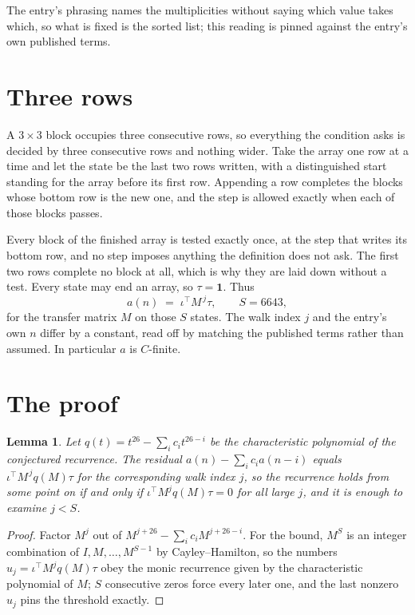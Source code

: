 \documentclass[11pt,a4paper]{article}
\theoremstyle{plain}
\newtheorem{lemma}[theorem]{Lemma}
\theoremstyle{definition}
\begin{document}
The entry's phrasing names the multiplicities without saying which value takes which, so what is fixed is the sorted list; this reading is pinned against the entry's own published terms.

\section{Three rows}

A $3\times3$ block occupies three consecutive rows, so everything the condition asks is decided
by three consecutive rows and nothing wider. Take the array one row at a time and let the state
be the last two rows written, with a distinguished start standing for the array before its
first row. Appending a row completes the blocks whose bottom row is the new one, and the step
is allowed exactly when each of those blocks passes.

Every block of the finished array is tested exactly once, at the step that writes its bottom
row, and no step imposes anything the definition does not ask. The first two rows complete no
block at all, which is why they are laid down without a test. Every state may end an array, so
$\tau=\mathbf{1}$. Thus
\[
a(n)\;=\;\iota^{\!\top}M^{\,j}\tau ,\qquad S=6643,
\]
for the transfer matrix $M$ on those $S$ states. The walk index $j$ and the entry's own $n$
differ by a constant, read off by matching the published terms rather than assumed. In
particular $a$ is $C$-finite.

\section{The proof}

\begin{lemma}\label{lem:crit}
Let $q(t)=t^{26}-\sum_i c_it^{26-i}$ be the characteristic polynomial of the
conjectured recurrence. The residual $a(n)-\sum_ic_ia(n-i)$ equals
$\iota^{\!\top}M^{\,j}q(M)\tau$ for the corresponding walk index $j$, so the recurrence
holds from some point on if and only if $\iota^{\!\top}M^{j}q(M)\tau=0$ for all large $j$,
and it is enough to examine $j<S$.
\end{lemma}

\begin{proof}
Factor $M^{j}$ out of $M^{j+26}-\sum_ic_iM^{j+26-i}$. For the bound, $M^{S}$
is an integer combination of $I,M,\dots,M^{S-1}$ by Cayley--Hamilton, so the numbers
$u_j=\iota^{\!\top}M^{j}q(M)\tau$ obey the monic recurrence given by the characteristic
polynomial of $M$; $S$ consecutive zeros force every later one, and the last nonzero $u_j$
pins the threshold exactly.
\end{proof}
\end{document}
